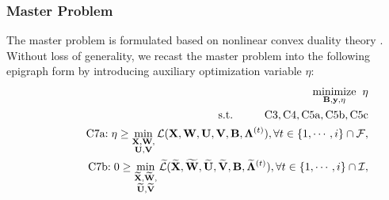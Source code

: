 \documentclass[12pt, draftclsnofoot, onecolumn]{IEEEtran}
\DeclareMathOperator{\mino}{minimize}
\begin{document}
\subsubsection{Master Problem}
The master problem is formulated based on nonlinear convex duality theory \cite{geoffrion1972generalized}. Without loss of generality, we recast the master problem into the following epigraph form by introducing auxiliary optimization variable $\eta$:
\begin{eqnarray}
\label{Master_problem}
    &&\hspace*{-8mm}\underset{\mathbf{B},\mathbf{y},\eta}{\mino}\hspace*{2mm}\eta\notag\\
    &&\hspace*{-4mm}\mbox{s.t.}\hspace*{10mm}\mbox{C3}, \mbox{C4},\mbox{C5a}, \mbox{C5b},\mbox{C5c}\notag\\
    &&\hspace*{10mm}\mbox{C7a}\mbox{:}\hspace*{1mm}\eta\geq\min_{\substack{\mathbf{X},\mathbf{W},\\\mathbf{U},\mathbf{V}}}\mathcal{L}(\mathbf{X},\mathbf{W},\mathbf{U},\mathbf{V},\mathbf{B},\bm{\Lambda}^{(t)}),\hspace*{0mm}\forall t\in\{1,\cdots,i\}\cap\mathcal{F},\\
    &&\hspace*{10mm}\mbox{C7b}\mbox{:}\hspace*{1mm}0\geq\min_{\substack{\widetilde{\mathbf{X}},\widetilde{\mathbf{W}},\\\widetilde{\mathbf{U}},\widetilde{\mathbf{V}}}}\widetilde{\mathcal{L}}(\widetilde{\mathbf{X}},\widetilde{\mathbf{W}},\widetilde{\mathbf{U}},\widetilde{\mathbf{V}},\mathbf{B},\widetilde{\bm{\Lambda}}^{(t)}),\hspace*{0mm}\forall t\in\{1,\cdots,i\}\cap\mathcal{I}\notag,\vspace*{-2mm}

\end{eqnarray}
\end{document}
